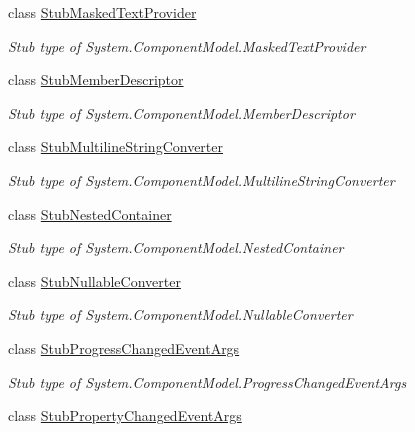 \begin{DoxyCompactItemize}
class \hyperlink{class_system_1_1_component_model_1_1_fakes_1_1_stub_masked_text_provider}{Stub\-Masked\-Text\-Provider}
\begin{DoxyCompactList}\small\item\em Stub type of System.\-Component\-Model.\-Masked\-Text\-Provider\end{DoxyCompactList}\item 
class \hyperlink{class_system_1_1_component_model_1_1_fakes_1_1_stub_member_descriptor}{Stub\-Member\-Descriptor}
\begin{DoxyCompactList}\small\item\em Stub type of System.\-Component\-Model.\-Member\-Descriptor\end{DoxyCompactList}\item 
class \hyperlink{class_system_1_1_component_model_1_1_fakes_1_1_stub_multiline_string_converter}{Stub\-Multiline\-String\-Converter}
\begin{DoxyCompactList}\small\item\em Stub type of System.\-Component\-Model.\-Multiline\-String\-Converter\end{DoxyCompactList}\item 
class \hyperlink{class_system_1_1_component_model_1_1_fakes_1_1_stub_nested_container}{Stub\-Nested\-Container}
\begin{DoxyCompactList}\small\item\em Stub type of System.\-Component\-Model.\-Nested\-Container\end{DoxyCompactList}\item 
class \hyperlink{class_system_1_1_component_model_1_1_fakes_1_1_stub_nullable_converter}{Stub\-Nullable\-Converter}
\begin{DoxyCompactList}\small\item\em Stub type of System.\-Component\-Model.\-Nullable\-Converter\end{DoxyCompactList}\item 
class \hyperlink{class_system_1_1_component_model_1_1_fakes_1_1_stub_progress_changed_event_args}{Stub\-Progress\-Changed\-Event\-Args}
\begin{DoxyCompactList}\small\item\em Stub type of System.\-Component\-Model.\-Progress\-Changed\-Event\-Args\end{DoxyCompactList}\item 
class \hyperlink{class_system_1_1_component_model_1_1_fakes_1_1_stub_property_changed_event_args}{Stub\-Property\-Changed\-Event\-Args}

\end{DoxyCompactItemize}
